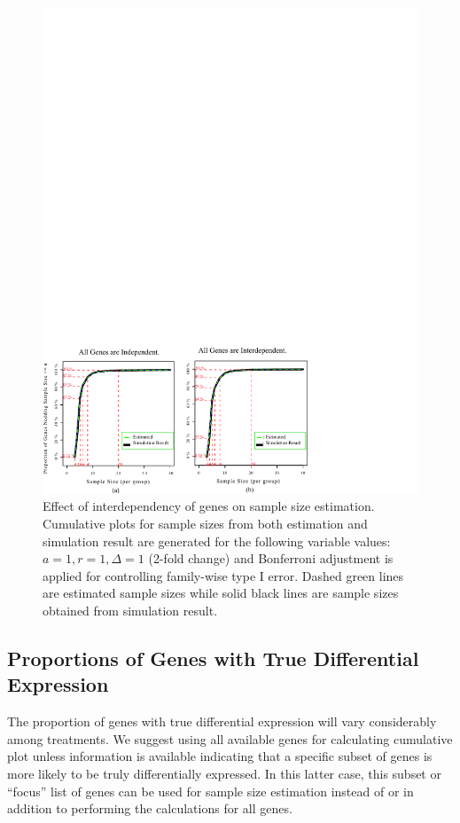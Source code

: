 \documentclass[12pt]{article}
\begin{document}
\begin{figure}%
  \caption[Effect of interdependency of genes on sample size
    estimation] {Effect of interdependency of genes on sample size
    estimation.  Cumulative plots for sample sizes from both
    estimation and simulation result are generated for the following
    variable values: $a = 1, r = 1, \Delta = 1$ (2-fold change) and
    Bonferroni adjustment is applied for controlling family-wise type I
    error. Dashed green lines are estimated sample sizes while solid
    black lines are sample sizes obtained from simulation result.}
  \label{fig:ResDep}
  \centerline{\includegraphics*[width=\textwidth]{ResDepF.pdf}}
\end{figure}

\subsection{Proportions of Genes with True Differential Expression}

The proportion of genes with true differential expression will vary
considerably among treatments. We suggest using all available genes
for calculating cumulative plot unless information is available
indicating that a specific subset of genes is more likely to be
truly differentially expressed. In this latter case, this subset or
``focus'' list of genes can be used for sample size estimation
instead of or in addition to performing the calculations for all
genes.
\end{document}
